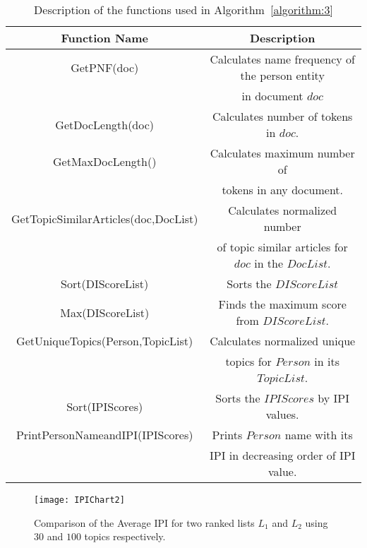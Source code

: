 \begin{table*}
\caption{Description of the functions used in Algorithm~\ref{algorithm:3}}
\label{default}
\begin{center}
\begin{tabular}{|c|c|} \hline
Function Name & Description \\ \hline
GetPNF(doc) & Calculates name frequency of the person entity \\
 & in document $doc$ \\ \hline
GetDocLength(doc) & Calculates number of tokens in $doc$. \\ \hline
GetMaxDocLength() & Calculates maximum number of \\
& tokens in any document.\\ \hline
GetTopicSimilarArticles(doc,DocList) &  Calculates normalized number \\
& of topic similar articles for $doc$ in the $DocList$. \\ \hline
Sort(DIScoreList) & Sorts the $DIScoreList$ \\ \hline
Max(DIScoreList) & Finds the maximum score from $DIScoreList$. \\ \hline
GetUniqueTopics(Person,TopicList) & Calculates normalized unique \\
& topics for $Person$ in its $TopicList$. \\ \hline
Sort(IPIScores) & Sorts the $IPIScores$ by IPI values. \\ \hline
PrintPersonNameandIPI(IPIScores) & Prints $Person$ name with its \\
& IPI in decreasing order of IPI value. \\ \hline
\end{tabular}
\end{center}
\vspace{-10pt}
\end{table*}%

\begin{figure}
\begin{center}
\texttt{[image: IPIChart2]}
\end{center}
\caption{Comparison of the Average IPI for two ranked lists $L_1$ and $L_2$ using $30$ and $100$ topics respectively.}
\label{figure:IPI}
\vspace{-10pt}
\end{figure}